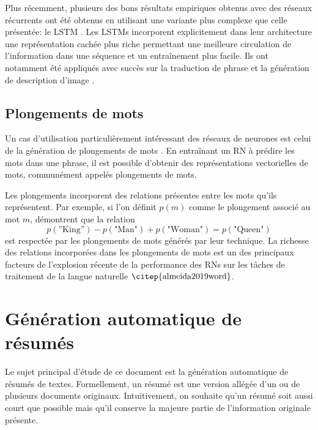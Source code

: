 Plus récemment, plusieurs des bons résultats empiriques obtenus avec 
des réseaux récurrents ont été obtenus en utilisant une variante plus 
complexe que celle présentée: le LSTM \citep{10.1162/neco.1997.9.8.1735}.
Les LSTMs incorporent explicitement dans leur architecture 
une représentation cachée plus riche 
permettant une meilleure circulation de l'information 
dans une séquence et un entraînement plus facile.
Ils ont notamment été appliqués avec succès sur la traduction 
de phrase \citep{wu2016googles} et la génération de description
d'image \citep{xu2016show}.

\subsection{Plongements de mots}

Un cas d'utilisation particulièrement intéressant 
des réseaux de neurones est celui de la génération de plongements 
de mots \citep{NIPS2013_9aa42b31,pennington2014glove,joulin2016bag}.
En entraînant un RN à prédire les mots dans une phrase,
il est possible d'obtenir des représentations vectorielles
de mots, communément appelés plongements de mots.

Les plongements incorporent des relations 
présentes entre les mots qu'ils représentent.
Par exemple, si l'on définit $p(m)$ comme le plongement 
associé au mot $m$, \citet{NIPS2013_9aa42b31} démontrent 
que la relation 
\begin{equation*}
    p(\text{”King”}) - p(\text{"Man"}) + p(\text{"Woman"}) = p(\text{"Queen"})
\end{equation*}
est respectée par les plongements de mots générés par leur technique.
La richesse des relations incorporées dans les plongements de mots 
est un des principaux facteurs de l'explosion récente de la performance des 
RNs sur les tâches de traitement de la langue naturelle $\mbox{\citep{almeida2019word}}$.

\section{Génération automatique de résumés}

Le sujet principal d'étude de ce document est la génération automatique 
de résumés de textes.
Formellement, un résumé est une version allégée d'un ou de plusieurs 
documents originaux.
Intuitivement, on souhaite qu'un résumé soit aussi court que 
possible mais qu'il conserve la majeure 
partie de l'information originale présente.

